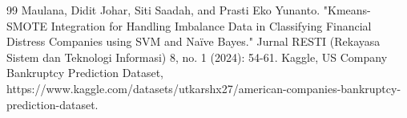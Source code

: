 
\begin{thebibliography}{99}
Maulana, Didit Johar, Siti Saadah, and Prasti Eko Yunanto. "Kmeans-SMOTE Integration for Handling Imbalance Data in Classifying Financial Distress Companies using SVM and Naïve Bayes." Jurnal RESTI (Rekayasa Sistem dan Teknologi Informasi) 8, no. 1 (2024): 54-61.
Kaggle, US Company Bankruptcy Prediction Dataset, https://www.kaggle.com/datasets/utkarshx27/american-companies-bankruptcy-prediction-dataset.
\end{thebibliography}